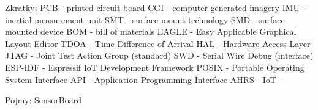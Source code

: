 Zkratky:
PCB - printed circuit board
CGI - computer generated imagery
IMU - inertial measurement unit
SMT - surface mount technology
SMD - surface mounted device
BOM - bill of materials
EAGLE - Easy Applicable Graphical Layout Editor
TDOA - Time Difference of Arrival
HAL - Hardware Access Layer
JTAG - Joint Test Action Group (standard)
SWD - Serial Wire Debug (interface)
ESP-IDF - Espressif IoT Development Framework
POSIX - Portable Operating System Interface
API - Application Programming Interface
AHRS - 
IoT - 

Pojmy:
SensorBoard